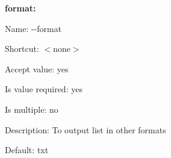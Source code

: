 {\bfseries format\+:}


\begin{DoxyItemize}
\item Name\+: {\ttfamily -\/-\/format}
\item Shortcut\+: $<$none$>$
\item Accept value\+: yes
\item Is value required\+: yes
\item Is multiple\+: no
\item Description\+: To output list in other formats
\item Default\+: {\ttfamily \textquotesingle{}txt\textquotesingle{}} 
\end{DoxyItemize}